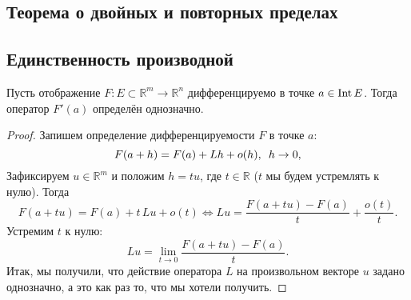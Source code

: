 \subsection{\color{red} Теорема о двойных и повторных пределах}

\subsection{Единственность производной}

\begin{theorem}
	Пусть отображение \(F \colon E \subset \mathbb{R}^m \to \mathbb{R}^n\) дифференцируемо в точке \(a \in \operatorname{Int} E\). Тогда оператор \(F'(a)\) определён однозначно.
\end{theorem}
\begin{proof}
	Запишем определение дифференцируемости \(F\) в точке \(a\): \[
		F(a + h) = F(a) + Lh + o(h), \enskip h \to 0,	
	\]
	Зафиксируем \(u \in \mathbb{R}^m\) и положим \(h = tu\), где \(t \in \mathbb{R}\) (\(t\) мы будем устремлять к нулю). Тогда \[
		F(a + tu) = F(a) + t \, Lu + o(t) \iff Lu = \frac{F(a + tu) - F(a)}{t} + \frac{o(t)}{t}.
	\]
	Устремим \(t\) к нулю: \[
		Lu = \lim_{t \to 0} \frac{F(a + tu) - F(a)}{t}.	
	\]
	Итак, мы получили, что действие оператора \(L\) на произвольном векторе \(u\) задано однозначно, а это как раз то, что мы хотели получить.
\end{proof}


